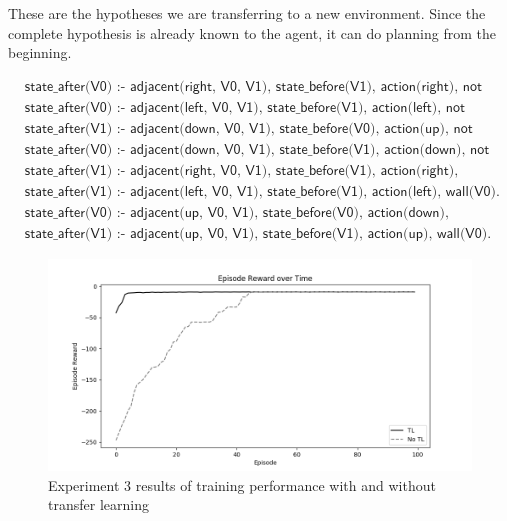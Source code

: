 These are the hypotheses we are transferring to a new environment.
Since the complete hypothesis is already known to the agent, it can do planning from the beginning.

\begin{equation}
\begin{split}
 &\textsf{state\_after(V0) :- adjacent(right, V0, V1), state\_before(V1), action(right), not wall(V0).}\\
 &\textsf{state\_after(V0) :- adjacent(left, V0, V1), state\_before(V1), action(left), not wall(V0).}\\
 &\textsf{state\_after(V1) :- adjacent(down, V0, V1), state\_before(V0), action(up), not wall(V1).}\\
 &\textsf{state\_after(V0) :- adjacent(down, V0, V1), state\_before(V1), action(down), not wall(V0).}\\
 &\textsf{state\_after(V1) :- adjacent(right, V0, V1), state\_before(V1), action(right), wall(V0).}\\
 &\textsf{state\_after(V1) :- adjacent(left, V0, V1), state\_before(V1), action(left), wall(V0).}\\
 &\textsf{state\_after(V0) :- adjacent(up, V0, V1), state\_before(V0), action(down), wall(V1).}\\
 &\textsf{state\_after(V1) :- adjacent(up, V0, V1), state\_before(V1), action(up), wall(V0).}
\end{split}
\end{equation}

\begin{figure}[!htb]
\centering
\includegraphics[width=1.0\textwidth]{./figures/experiment4_after_training}
\caption{Experiment 3 results of training performance with and without transfer learning}
\label{experiment3_training}
\end{figure}

